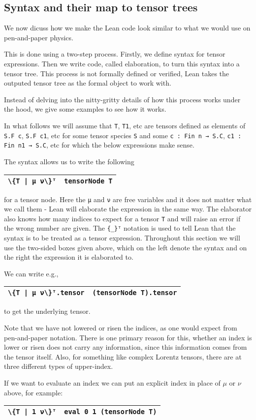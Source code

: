\documentclass[a4paper, 11pt]{article}
\newcommand{\syntaxElab}[2]{ 
  \arrayrulecolor{mycolor}
  \begin{center}
    \begin{tabular}{|p{1.7in} | p{4in}|}
    \hline
    \hfill {#1} & {#2} \\
    \hline
    \end{tabular}
    \end{center}
  \arrayrulecolor{black}
}
\begin{document}
\subsection{Syntax and their map to tensor trees}


We now dicuss how we make the Lean code look similar to what we would use on pen-and-paper physics. 

This is done using a two-step process. Firstly, we define syntax for tensor expressions. 
Then we write code, called elaboration, to turn this syntax into a tensor tree. This process is not formally defined or 
verified, Lean takes the outputed tensor tree as the formal object to work with.

Instead of delving into the nitty-gritty details of how this process works under the hood, 
we give some examples to see how it works. 

In what follows we will assume that \lstinline|T|, \lstinline|T1|, etc are tensors defined as 
elements of \lstinline|S.F c|, \lstinline|S.F c1|, etc for 
some tensor species \lstinline|S| and some \lstinline|c : Fin n → S.C|, \lstinline|c1 : Fin n1 → S.C|, etc 
for which the below expressions make sense.

The syntax allows us to write the following 
\syntaxElab{\lstinline!\{T | μ ν\}ᵀ!}{{\lstinline!tensorNode T!}}
for a tensor node. Here the \lstinline|μ| and \lstinline|ν| are free variables and it does not 
matter what we call them - Lean will elaborate the expression in the same way.
The elaborator also knows how many indices to expect for a tensor \lstinline|T| and will raise an error if
the wrong number are given. The \lstinline|{_}ᵀ| notation is used to tell Lean that the syntax
is to be treated as a tensor expression. Throughout this section we will use the two-sided boxes 
given above, which on the left denote the syntax and on the right the expression it is elaborated to. 

We can write e.g.,
\syntaxElab{\lstinline!\{T | μ ν\}ᵀ.tensor!}{{\lstinline!(tensorNode T).tensor!}}
to get the underlying tensor.

Note that we have not lowered or risen the indices, as one would expect from pen-and-paper notation.
There is one primary reason for this, whether an index is lower or risen does not carry any information, 
since this information comes from the tensor itself. Also, for something like complex Lorentz tensors, 
there are at three different types of upper-index. 

If we want to evaluate an index we can put an explicit index in place of $\mu$ or $\nu$ above, 
for example:
\syntaxElab{\lstinline!\{T | 1 ν\}ᵀ!}{\lstinline!eval 0 1 (tensorNode T)!}
\end{document}

